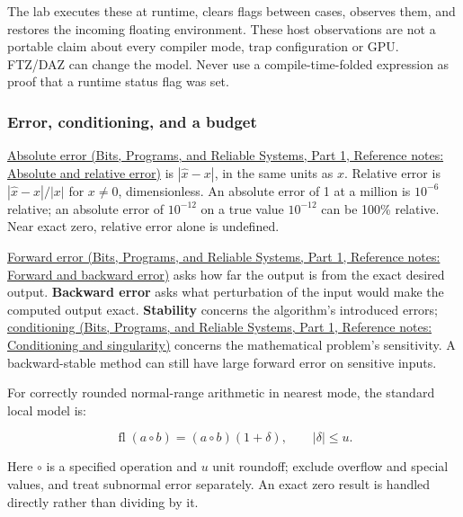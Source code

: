 The lab executes these at runtime, clears flags between cases, observes them, and restores the incoming floating environment. These host observations are not a portable claim about every compiler mode, trap configuration or GPU. FTZ/DAZ can change the model. Never use a compile-time-folded expression as proof that a runtime status flag was set.

\subsubsection{Error, conditioning, and a budget}\label{05-engine-i-ch001-error-conditioning-and-a-budget}

\hypertarget{05-engine-i-ch001-error-conditioning-and-a-budget}{}

\href{../01-Bits-Programs-and-Reliable-Systems-P01/main.pdf\#appendix-3ae74e89b4e6}{Absolute error (Bits, Programs, and Reliable Systems, Part 1, Reference notes: Absolute and relative error)} is \(|\widehat x-x|\), in the same units as \(x\). Relative error is \(|\widehat x-x|/|x|\) for \(x\ne0\), dimensionless. An absolute error of 1 at a million is \(10^{-6}\) relative; an absolute error of \(10^{-12}\) on a true value \(10^{-12}\) can be 100\% relative. Near exact zero, relative error alone is undefined.

\href{../01-Bits-Programs-and-Reliable-Systems-P01/main.pdf\#appendix-a7fbaf6d1b1c}{Forward error (Bits, Programs, and Reliable Systems, Part 1, Reference notes: Forward and backward error)} asks how far the output is from the exact desired output. \textbf{Backward error} asks what perturbation of the input would make the computed output exact. \textbf{Stability} concerns the algorithm's introduced errors; \href{../01-Bits-Programs-and-Reliable-Systems-P01/main.pdf\#appendix-8f6a01f284a7}{conditioning (Bits, Programs, and Reliable Systems, Part 1, Reference notes: Conditioning and singularity)} concerns the mathematical problem's sensitivity. A backward-stable method can still have large forward error on sensitive inputs.

For correctly rounded normal-range arithmetic in nearest mode, the standard local model is:

\[
\operatorname{fl}(a\circ b)=(a\circ b)(1+\delta),\qquad |\delta|\le u.
\]

Here \(\circ\) is a specified operation and \(u\) unit roundoff; exclude overflow and special values, and treat subnormal error separately. An exact zero result is handled directly rather than dividing by it.

